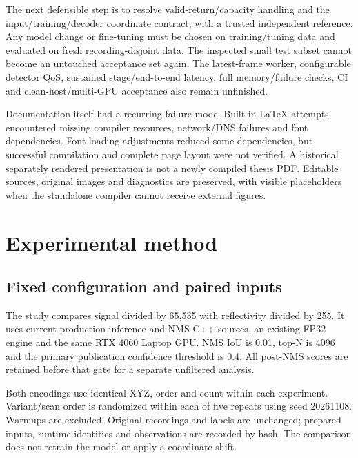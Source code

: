 \documentclass[11pt,a4paper]{article}
\begin{document}
The next defensible step is to resolve valid-return/capacity handling and the input/training/decoder coordinate contract, with a trusted independent reference. Any model change or fine-tuning must be chosen on training/tuning data and evaluated on fresh recording-disjoint data. The inspected small test subset cannot become an untouched acceptance set again. The latest-frame worker, configurable detector QoS, sustained stage/end-to-end latency, full memory/failure checks, CI and clean-host/multi-GPU acceptance also remain unfinished.

Documentation itself had a recurring failure mode. Built-in LaTeX attempts encountered missing compiler resources, network/DNS failures and font dependencies. Font-loading adjustments reduced some dependencies, but successful compilation and complete page layout were not verified. A historical separately rendered presentation is not a newly compiled thesis PDF. Editable sources, original images and diagnostics are preserved, with visible placeholders when the standalone compiler cannot receive external figures.

\section{Experimental method}
\subsection{Fixed configuration and paired inputs}
The study compares signal divided by 65,535 with reflectivity divided by 255.
It uses current production inference and NMS C++ sources, an existing FP32
engine and the same RTX 4060 Laptop GPU. NMS IoU is 0.01, top-N is 4096 and the
primary publication confidence threshold is 0.4. All post-NMS scores are
retained before that gate for a separate unfiltered analysis.

Both encodings use identical XYZ, order and count within each experiment.
Variant/scan order is randomized within each of five repeats using seed
20261108. Warmups are excluded. Original recordings and labels are unchanged;
prepared inputs, runtime identities and observations are recorded by hash.
The comparison does not retrain the model or apply a coordinate shift.
\end{document}
